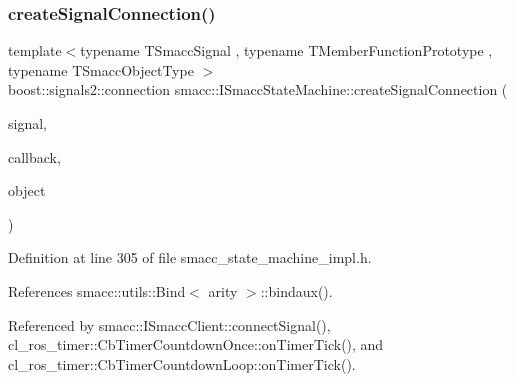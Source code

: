 \subsubsection{\texorpdfstring{create\+Signal\+Connection()}{createSignalConnection()}}
{\footnotesize\ttfamily template$<$typename T\+Smacc\+Signal , typename T\+Member\+Function\+Prototype , typename T\+Smacc\+Object\+Type $>$ \\
boost\+::signals2\+::connection smacc\+::\+I\+Smacc\+State\+Machine\+::create\+Signal\+Connection (\begin{DoxyParamCaption}\item[{T\+Smacc\+Signal \&}]{signal,  }\item[{T\+Member\+Function\+Prototype}]{callback,  }\item[{T\+Smacc\+Object\+Type $\ast$}]{object }\end{DoxyParamCaption})}



Definition at line 305 of file smacc\+\_\+state\+\_\+machine\+\_\+impl.\+h.



References smacc\+::utils\+::\+Bind$<$ arity $>$\+::bindaux().



Referenced by smacc\+::\+I\+Smacc\+Client\+::connect\+Signal(), cl\+\_\+ros\+\_\+timer\+::\+Cb\+Timer\+Countdown\+Once\+::on\+Timer\+Tick(), and cl\+\_\+ros\+\_\+timer\+::\+Cb\+Timer\+Countdown\+Loop\+::on\+Timer\+Tick().


